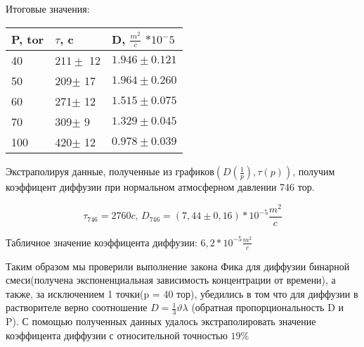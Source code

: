 \documentclass{article}
\begin{document}
Итоговые значения:

\begin{center}
    \begin{tabular}{ | m{3cm} | m{4cm} | m{4cm} | }
        \hline
        P, tor & $\tau$, c & D, $\frac{m^2}{c}$ $* 10^-5$ \\
        \hline
        40 & $211\pm$ 12 & $1.946 \pm 0.121$\\
        \hline
        50 & 209$\pm$ 17 & $1.964 \pm 0.260$ \\
        \hline
        60 & 271$\pm$ 12 & $1.515 \pm 0.075$\\ 
        \hline
        70 & 309$\pm$ 9 & $1.329 \pm 0.045$\\
        \hline
        100 & 420$\pm$ 12 & $0.978 \pm 0.039$\\
        \hline
    \end{tabular}
\end{center}

Экстраполируя данные, полученные из графиков$(D(\frac{1}{p}), \tau(p))$, получим 
коэффицент диффузии при нормальном атмосферном давлении 746 тор.

\[\tau_{746} = 2760c, \hspace{2pt} D_{746} = (7,44 \pm 0,16) * 10^{-5} \frac{m^2}{c}\]

Табличное значение коэффицента диффузии: $6,2 * 10^{-5} \frac{m^2}{c}$

\vspace{20pt}

Таким образом мы проверили выполнение закона Фика для диффузии бинарной смеси(получена экспоненциальная зависимость концентрации от времени),
а также, за исключением 1 точки(p = 40 тор), убедились в том что для диффузии в растворителе верно соотношение 
$D = \frac{1}{3}\vartheta\lambda$ (обратная пропорциональность D и P). С помощью полученных данных удалось экстраполировать
значение коэффицента диффузии с относительной точностью $19\%$
\end{document}
